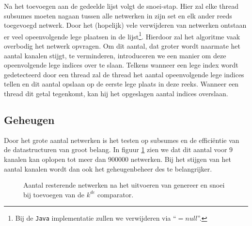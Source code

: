 \documentclass{article}
\begin{document}
Na het toevoegen aan de gedeelde lijst volgt de snoei-stap. Hier zal elke thread subsumes moeten nagaan tussen alle netwerken in zijn set en elk ander reeds toegevoegd netwerk.
Door het (hopelijk) vele verwijderen van netwerken ontstaan er veel opeenvolgende lege plaatsen in de lijst\footnote{Bij de \texttt{Java} implementatie zullen we verwijderen via  ``${= null}$''.}.
Hierdoor zal het algoritme vaak overbodig het netwerk opvragen.
Om dit aantal, dat groter wordt naarmate het aantal kanalen stijgt, te verminderen, introduceren we een manier om deze opeenvolgende lege indices over te slaan. 
Telkens wanneer een lege index wordt gedetecteerd door een thread zal de thread het aantal opeenvolgende lege indices tellen en dit aantal opslaan op de eerste lege plaats in deze reeks.
Wanneer een thread dit getal tegenkomt, kan hij het opgeslagen aantal indices overslaan.

\subsection{Geheugen}
Door het grote aantal netwerken is het testen op subsumes en de effici\"entie van de datastructuren van groot belang. In figuur \ref{netwerkVerloop9kanalen} zien we dat dit aantal voor $9$ kanalen kan oplopen tot meer dan $900000$ netwerken. Bij het stijgen van het aantal kanalen wordt dan ook het geheugenbeheer des te belangrijker.
\begin{figure}[!h]
	\centering
	\caption{Aantal resterende netwerken na het uitvoeren van genereer en snoei bij toevoegen van de $k^{de}$ comparator.}
	\label{netwerkVerloop9kanalen}
\end{figure}
\end{document}
